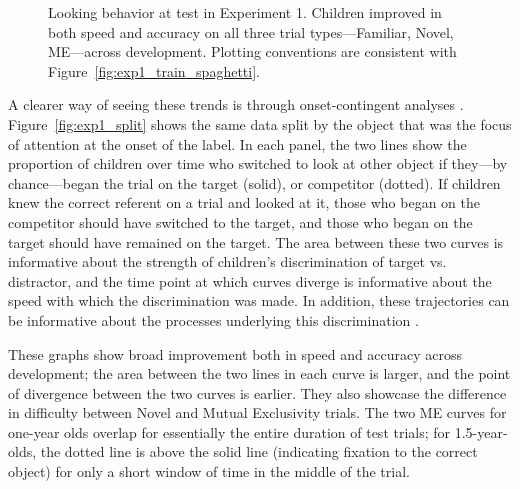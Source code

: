 \documentclass[man,floatsintext]{apa6}
\begin{document}
\begin{figure}[tb]
	\caption{\label{fig:exp1_test_spaghetti}Looking behavior at test in Experiment 1. Children improved in both speed and accuracy on all three trial types---Familiar, Novel, ME---across development. Plotting conventions are consistent with Figure~\ref{fig:exp1_train_spaghetti}.}
\end{figure}

A clearer way of seeing these trends is through onset-contingent analyses \cite{fernald2008}. Figure~\ref{fig:exp1_split} shows the same data split by the object that was the focus of attention at the onset of the label. In each panel, the two lines show the proportion of children over time who switched to look at other object if they---by chance---began the trial on the target (solid), or competitor (dotted). If children knew the correct referent on a trial and looked at it, those who began on the competitor should have switched to the target, and those who began on the target should have remained on the target. The area between these two curves is informative about the strength of children's discrimination of target vs. distractor, and the time point at which curves diverge is informative about the speed with which the discrimination was made. In addition, these trajectories can be informative about the processes underlying this discrimination \cite{Halberda2006}. 

These graphs show broad improvement both in speed and accuracy across development; the area between the two lines in each curve is larger, and the point of divergence between the two curves is earlier. They also showcase the difference in difficulty between Novel and Mutual Exclusivity trials. The two ME curves for one-year olds overlap for essentially the entire duration of test trials; for 1.5-year-olds, the dotted line is above the solid line (indicating fixation to the correct object) for only a short window of time in the middle of the trial. 
\end{document}
